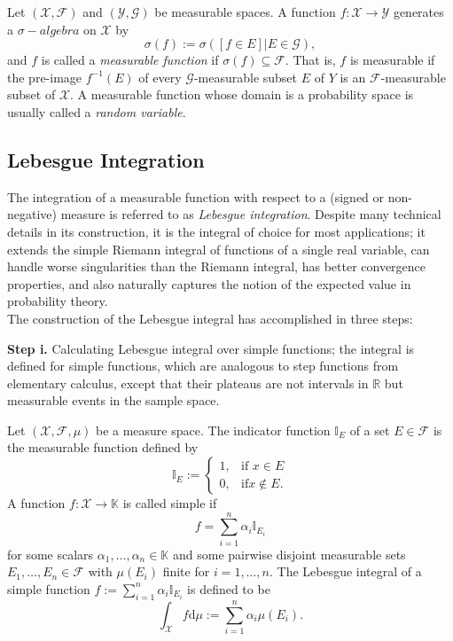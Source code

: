 \begin{defn}
	Let $(\mathscr{X}, \mathscr{F})$ and $(\mathscr{Y}, \mathscr{G})$ be measurable spaces. A function $f : \mathscr{X} \to \mathscr{Y}$
generates a $\sigma-algebra$ on $\mathscr{X}$ by
	\begin{equation*}
	\sigma(f) := \sigma({[f \in E] | E \in \mathscr{G}}) ,
	\end{equation*}
	and $f$ is called a \textit{measurable function} if $\sigma(f) \subseteq \mathscr{F}$. That is, $f$ is measurable if the pre-image
$f^{-1}(E)$ of every $\mathscr{G}$-measurable subset $E$ of $Y$ is an $\mathscr{F}$-measurable subset of $\mathscr{X}$. A measurable
function whose domain is a probability space is usually called a \textit{random variable}.
\end{defn}
\subsection{Lebesgue Integration}
The integration of a measurable function with respect to a (signed or non-negative) measure is referred to as \textit{Lebesgue integration}. Despite many technical details in its construction, it is the integral of choice for
most applications; it extends the simple Riemann integral of functions of a single real variable, can handle worse singularities than the Riemann
integral, has better convergence properties, and also naturally captures the notion of the expected value in probability theory.\\
The construction of the Lebesgue integral has accomplished in three steps:

\textbf{Step i.} Calculating Lebesgue integral over simple functions; the integral is defined for simple functions, which are analogous to step functions from elementary
calculus, except that their plateaus are not intervals in $\mathbb{R}$ but measurable events in the
sample space.
\begin{defn}
	Let $(\mathscr{X}, \mathscr{F}, \mu)$ be a measure space. The indicator function $\mathbb{I}_E$ of a set
$E \in \mathscr{F}$ is the measurable function defined by
	\begin{equation*}
		\mathbb{I}_E := 
		\begin{cases}
		1,& \text{if } x \in E\\
		0,& \text{if} x \notin E.
		\end{cases}
	\end{equation*}
	A function $f : \mathscr{X} \to \mathbb{K}$ is called simple if
	\begin{equation*}
		f = \sum_{i=1}^{n} \alpha_i \mathbb{I}_{E_{i}}
	\end{equation*}
	for some scalars $\alpha_1, \dots ,\alpha_n \in \mathbb{K}$ and some pairwise disjoint measurable sets $E_1, \dots, E_n \in \mathscr{F}$
with $\mu(E_i)$ finite for $i = 1, \dots, n$. The Lebesgue integral of a simple function $f := \sum_{i=1}^{n} \alpha_i \mathbb{I}_{E_{i}}
$ is defined to be
	\begin{equation*}
		\int_{\mathscr{X}} f \text{d}\mu := \sum_{i=1}^{n} \alpha_i \mu(E_i).
	\end{equation*}
\end{defn}

